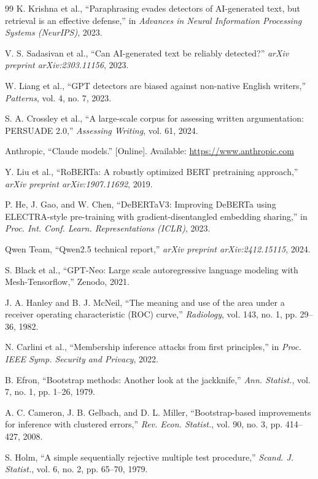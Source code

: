 \documentclass[conference]{IEEEtran}
\begin{document}
\begin{thebibliography}{99}
 K. Krishna et al., ``Paraphrasing evades detectors of AI-generated text, but retrieval is an effective defense,'' in \emph{Advances in Neural Information Processing Systems (NeurIPS)}, 2023.

 V. S. Sadasivan et al., ``Can AI-generated text be reliably detected?'' \emph{arXiv preprint arXiv:2303.11156}, 2023.

 W. Liang et al., ``GPT detectors are biased against non-native English writers,'' \emph{Patterns}, vol. 4, no. 7, 2023.

 S. A. Crossley et al., ``A large-scale corpus for assessing written argumentation: PERSUADE 2.0,'' \emph{Assessing Writing}, vol. 61, 2024.

 Anthropic, ``Claude models.'' [Online]. Available: \url{https://www.anthropic.com}

 Y. Liu et al., ``RoBERTa: A robustly optimized BERT pretraining approach,'' \emph{arXiv preprint arXiv:1907.11692}, 2019.

 P. He, J. Gao, and W. Chen, ``DeBERTaV3: Improving DeBERTa using ELECTRA-style pre-training with gradient-disentangled embedding sharing,'' in \emph{Proc. Int. Conf. Learn. Representations (ICLR)}, 2023.

 Qwen Team, ``Qwen2.5 technical report,'' \emph{arXiv preprint arXiv:2412.15115}, 2024.

 S. Black et al., ``GPT-Neo: Large scale autoregressive language modeling with Mesh-Tensorflow,'' Zenodo, 2021.

 J. A. Hanley and B. J. McNeil, ``The meaning and use of the area under a receiver operating characteristic (ROC) curve,'' \emph{Radiology}, vol. 143, no. 1, pp. 29--36, 1982.

 N. Carlini et al., ``Membership inference attacks from first principles,'' in \emph{Proc. IEEE Symp. Security and Privacy}, 2022.

 B. Efron, ``Bootstrap methods: Another look at the jackknife,'' \emph{Ann. Statist.}, vol. 7, no. 1, pp. 1--26, 1979.

 A. C. Cameron, J. B. Gelbach, and D. L. Miller, ``Bootstrap-based improvements for inference with clustered errors,'' \emph{Rev. Econ. Statist.}, vol. 90, no. 3, pp. 414--427, 2008.

 S. Holm, ``A simple sequentially rejective multiple test procedure,'' \emph{Scand. J. Statist.}, vol. 6, no. 2, pp. 65--70, 1979.

\end{thebibliography}
\end{document}
